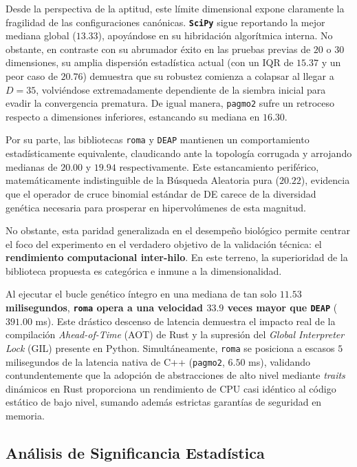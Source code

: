 \documentclass[12pt,a4paper,twoside,openright]{book}
\begin{document}
    Desde la perspectiva de la aptitud, este límite dimensional expone claramente la fragilidad de las configuraciones canónicas. \textbf{\texttt{SciPy}} sigue reportando la mejor mediana global ($13.33$), apoyándose en su hibridación algorítmica interna. No obstante, en contraste con su abrumador éxito en las pruebas previas de $20$ o $30$ dimensiones, su amplia dispersión estadística actual (con un IQR de $15.37$ y un peor caso de $20.76$) demuestra que su robustez comienza a colapsar al llegar a $D=35$, volviéndose extremadamente dependiente de la siembra inicial para evadir la convergencia prematura. De igual manera, \texttt{pagmo2} sufre un retroceso respecto a dimensiones inferiores, estancando su mediana en $16.30$.

    Por su parte, las bibliotecas \texttt{roma} y \texttt{DEAP} mantienen un comportamiento estadísticamente equivalente, claudicando ante la topología corrugada y arrojando medianas de $20.00$ y $19.94$ respectivamente. Este estancamiento periférico, matemáticamente indistinguible de la Búsqueda Aleatoria pura ($20.22$), evidencia que el operador de cruce binomial estándar de DE carece de la diversidad genética necesaria para prosperar en hipervolúmenes de esta magnitud.

    No obstante, esta paridad generalizada en el desempeño biológico permite centrar el foco del experimento en el verdadero objetivo de la validación técnica: el \textbf{rendimiento computacional inter-hilo}. En este terreno, la superioridad de la biblioteca propuesta es categórica e inmune a la dimensionalidad.

    Al ejecutar el bucle genético íntegro en una mediana de tan solo \textbf{$11.53$ milisegundos}, \textbf{\texttt{roma} opera a una velocidad $33.9$ veces mayor que \texttt{DEAP}} ($391.00$ ms). Este drástico descenso de latencia demuestra el impacto real de la compilación \textit{Ahead-of-Time} (AOT) de Rust y la supresión del \textit{Global Interpreter Lock} (GIL) presente en Python. Simultáneamente, \texttt{roma} se posiciona a escasos $5$ milisegundos de la latencia nativa de C++ (\texttt{pagmo2}, $6.50$ ms), validando contundentemente que la adopción de abstracciones de alto nivel mediante \textit{traits} dinámicos en Rust proporciona un rendimiento de CPU casi idéntico al código estático de bajo nivel, sumando además estrictas garantías de seguridad en memoria.

\subsection{Análisis de Significancia Estadística}
\end{document}
